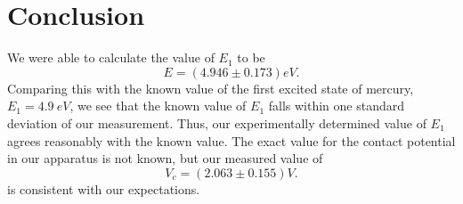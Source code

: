 \documentclass[aps, reprint,amsmath,amssymb]{revtex4-1} %
\begin{document}
\section{Conclusion}
We were able to calculate the value of $E_1$ to be
\[
    E = (4.946 \pm 0.173) \si{eV}.
\]
Comparing this with the known value of the first excited state of mercury, $E_1 = \SI{4.9}{eV}$, we see that the known value of $E_1$ falls within one standard deviation of our measurement. Thus, our experimentally determined value of $E_1$ agrees reasonably with the
known value. The exact value for the contact potential in our apparatus is not known, but our measured value of 
\[
    V_c = (2.063 \pm 0.155) \si{V}.
\]
is consistent with our expectations.
\end{document}
